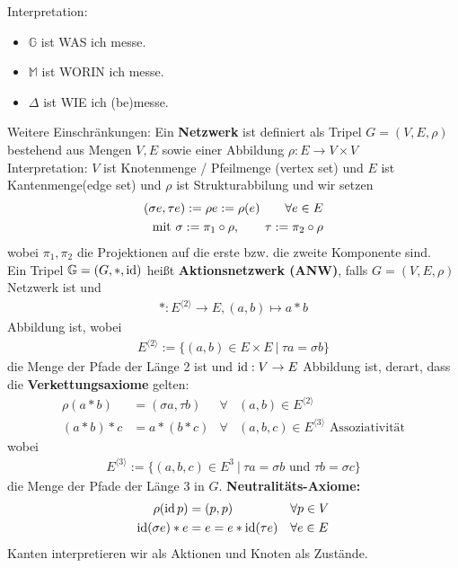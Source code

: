 Interpretation:
\begin{itemize}
	\item $\mathbb{G}$ ist WAS ich messe.
	\item $\mathbb{M}$ ist WORIN ich messe.
	\item $\Delta$ ist WIE ich (be)messe.
\end{itemize}
Weitere Einschränkungen: Ein \textbf{Netzwerk} ist definiert als Tripel $G=(V,E,\rho)$ bestehend aus Mengen $V,E$ sowie einer Abbildung $\rho:E\to V\times V$\\
Interpretation: $V$ ist Knotenmenge / Pfeilmenge (vertex set) und $E$ ist Kantenmenge(edge set) und $\rho$ ist Strukturabbilung und wir setzen
\begin{align*}
	(\sigma e,\tau e):=\rho e:=\rho(e)\qquad\forall e\in E\\
	\mit\sigma:=\pi_1\circ\rho,\qquad\tau:=\pi_2\circ\rho
\end{align*}
wobei $\pi_1,\pi_2$ die Projektionen auf die erste bzw. die zweite Komponente sind.\\
Ein Tripel $\mathbb{G}=(G,\ast,\id)$ heißt \textbf{Aktionsnetzwerk (ANW)}, falls $G=(V,E,\rho)$ Netzwerk ist und 
\begin{align*}
	\ast:E^{\langle 2\rangle}\to E, (a,b)\mapsto a\ast b
\end{align*}
Abbildung ist, wobei
\begin{align*}
	E^{\langle 2\rangle}:=\big\lbrace (a,b)\in E\times E~\big|~\tau a =\sigma b\big\rbrace
\end{align*}
die Menge der Pfade der Länge 2 ist und $\id:V\to E$ Abbildung ist, derart, dass die \textbf{Verkettungsaxiome} gelten:
\begin{align*}
	\rho(a\ast b)&=(\sigma a,\tau b) &\forall& (a,b)\in E^{\langle 2\rangle}\\
	(a\ast b)\ast c&=a\ast(b\ast c) &\forall& (a,b,c)\in E^{\langle 3\rangle}\text{ Assoziativität}
\end{align*}
wobei 
\begin{align*}
	E^{\langle 3\rangle}:=\big\lbrace(a,b,c)\in E^3~\big|~\tau a=\sigma b\text{ und }\tau b=\sigma c\big\rbrace
\end{align*}
die Menge der Pfade der Länge 3 in $G$.
\textbf{Neutralitäts-Axiome:}
\begin{align*}
	\rho (\id p)&=(p,p) &\forall& p\in V\\
	\id(\sigma e)\ast e&=e=e\ast\id(\tau e) &\forall& e\in E
\end{align*}
Kanten interpretieren wir als Aktionen und Knoten als Zustände.

